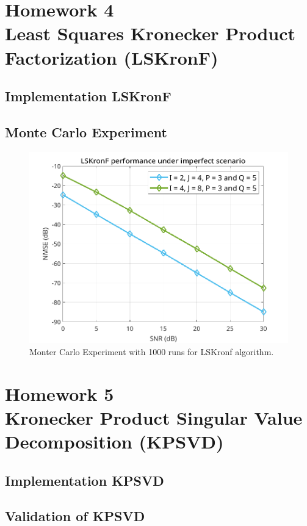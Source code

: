 \documentclass[a4paper,10pt]{article}
\begin{document}
\newpage
\section*{Homework 4 \\ Least Squares Kronecker Product Factorization (LSKronF)}

    \subsection*{Implementation LSKronF}

    \subsection*{Monte Carlo Experiment}

    \begin{figure}[ht!]
        \centering 
        \includegraphics[width=0.75\linewidth]{figs/hw4.png} \par 
        \caption{Monter Carlo Experiment with 1000 runs for LSKronf algorithm.}
        \label{fig:hw4} 
    \end{figure}

\newpage
\section*{Homework 5 \\ Kronecker Product Singular Value Decomposition (KPSVD)}

    \subsection*{Implementation KPSVD}

    \subsection*{Validation of KPSVD}
\end{document}
